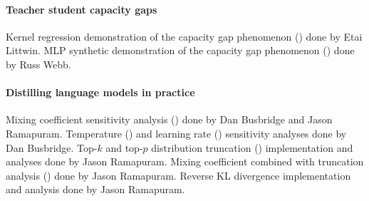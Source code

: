 \paragraph{Teacher student capacity gaps} Kernel regression demonstration of the capacity gap phenomenon () done by Etai Littwin.
MLP synthetic demonstration of the capacity gap phenomenon ()
done by Russ Webb.

\paragraph{Distilling language models in practice}
Mixing coefficient sensitivity analysis () done by Dan Busbridge and Jason Ramapuram.
Temperature () and learning rate () sensitivity analyses done by Dan Busbridge.
Top-$k$ and top-$p$ distribution truncation () implementation and analyses done by Jason Ramapuram.
Mixing coefficient combined with truncation analysis 
()
done by Jason Ramapuram.
Reverse KL divergence 
implementation and analysis done by Jason Ramapuram.
